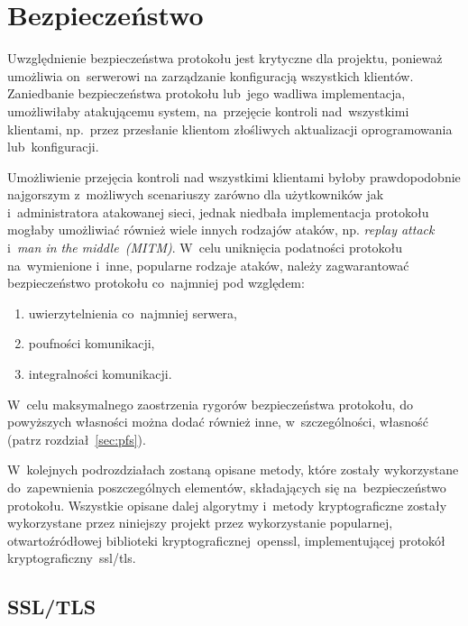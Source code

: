 \documentclass[thesis]{subfiles}
\begin{document}

\section{Bezpieczeństwo}
\label{sec:security}

Uwzględnienie bezpieczeństwa protokołu jest krytyczne dla projektu, ponieważ umożliwia on~serwerowi na zarządzanie konfiguracją wszystkich klientów. Zaniedbanie bezpieczeństwa protokołu lub~jego wadliwa implementacja, umożliwiłaby atakującemu system, na~przejęcie kontroli nad~wszystkimi klientami, np.~przez przesłanie klientom złośliwych aktualizacji oprogramowania lub~konfiguracji.

Umożliwienie przejęcia kontroli nad wszystkimi klientami byłoby prawdopodobnie najgorszym z~możliwych scenariuszy zarówno dla użytkowników jak i~administratora atakowanej sieci, jednak niedbała implementacja protokołu mogłaby umożliwiać również wiele innych rodzajów ataków, np. \emph{replay attack} i~\emph{man in the middle~(MITM)}. W~celu uniknięcia podatności protokołu na~wymienione i~inne, popularne rodzaje ataków, należy zagwarantować bezpieczeństwo protokołu co~najmniej pod względem:
\begin{enumerate}
\item uwierzytelnienia co~najmniej serwera,
\item poufności komunikacji,
\item integralności komunikacji.
\end{enumerate}
W~celu maksymalnego zaostrzenia rygorów bezpieczeństwa protokołu, do powyższych własności można dodać również inne, w~szczególności, własność \emph{} (patrz rozdział~\ref{sec:pfs}).

W~kolejnych podrozdziałach zostaną opisane metody, które zostały wykorzystane do~zapewnienia poszczególnych elementów, składających się na~bezpieczeństwo protokołu. Wszystkie opisane dalej algorytmy i~metody kryptograficzne zostały wykorzystane przez niniejszy projekt przez wykorzystanie popularnej, otwartoźródłowej biblioteki kryptograficznej~\gls{openssl}, implementującej protokół kryptograficzny~\gls{ssl/tls}.


\subsection{SSL/TLS}
\label{sec:ssl-tls}
\end{document}
